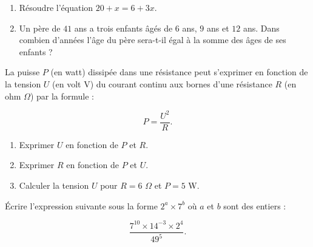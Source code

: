 \documentclass[a4paper,dvipsnames]{article}
\begin{document}
\bigskip

\exo[3 points] \vspace{-2mm}
\begin{enumerate}
  \item Résoudre l'équation $20+x=6+3x$.
  \item Un père de $41$ ans a trois enfants âgés de $6$ ans, $9$ ans et $12$ ans. Dans combien d'années l'âge du père sera-t-il égal à la somme des âges de ses enfants ?
\end{enumerate}

\bigskip

\exo[3 points] La puisse $P$ (en watt) dissipée dans une résistance peut s'exprimer en fonction de la tension $U$ (en volt V) du courant continu aux bornes d'une résistance $R$ (en ohm $\Omega$) par la formule :

\[P=\dfrac{U^2}{R}.\]

\begin{enumerate}
  \item Exprimer $U$ en fonction de $P$ et $R$.
  \item Exprimer $R$ en fonction de $P$ et $U$.
  \item Calculer la tension $U$ pour $R=6$ $\Omega$ et $P=5$ W.
\end{enumerate}

\bigskip

\exo[2 points] Écrire l'expression suivante sous la forme $2^a\times 7^b$ où $a$ et $b$ sont des entiers :

\[\dfrac{7^{10}\times 14^{-3}\times 2^4}{49^5}.\]

\dotfill{}

\bigskip
\end{document}
